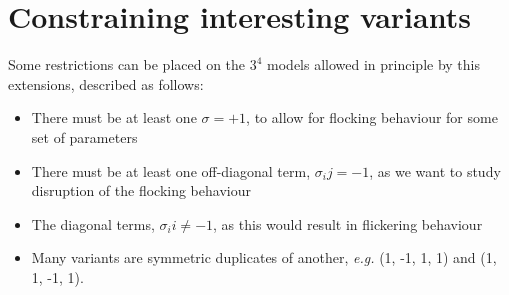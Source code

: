 \documentclass{article}
\begin{document}
\section{Constraining interesting variants}

Some restrictions can be placed on the $3^4$ models allowed in principle by this extensions, described as follows:

\begin{itemize}
  \item There must be at least one $\sigma=+1$, to allow for flocking behaviour for some set of parameters
  \item There must be at least one off-diagonal term, $\sigma_ij=-1$, as we want to study disruption of the flocking behaviour
  \item The diagonal terms, $\sigma_ii \ne -1$, as this would result in flickering behaviour
  \item Many variants are symmetric duplicates of another, \emph{e.g.} (1, -1, 1, 1) and (1, 1, -1, 1).
\end{itemize}
\end{document}
